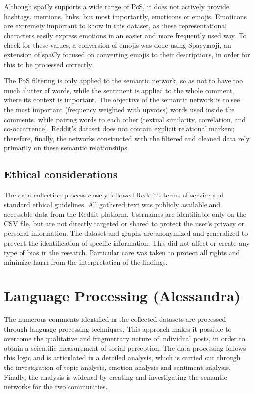 \documentclass[conference]{IEEEtran}
\begin{document}
Although spaCy supports a wide range of PoS, it does not actively provide hashtags, mentions, links, but most importantly, emoticons or emojis. Emoticons are extremely important to know in this dataset, as these representational characters easily express emotions in an easier and more frequently used way. To check for these values, a conversion of emojis was done using Spacymoji, an extension of spaCy focused on converting emojis to their descriptions, in order for this to be processed correctly.

The PoS filtering is only applied to the semantic network, so as not to have too much clutter of words, while the sentiment is applied to the whole comment, where its context is important. The objective of the semantic network is to see the most important (frequency weighted with upvotes) words used inside the comments, while pairing words to each other (textual similarity, correlation, and co-occurrence). Reddit’s dataset does not contain explicit relational markers; therefore, finally, the networks constructed with the filtered and cleaned data rely primarily on these semantic relationships.

\subsection{Ethical considerations}
The data collection process closely followed Reddit’s terms of service and standard ethical guidelines. All gathered text was publicly available and accessible data from the Reddit platform. Usernames are identifiable only on the CSV file, but are not directly targeted or shared to protect the user’s privacy or personal information. The dataset and graphs are anonymized and generalized to prevent the identification of specific information. This did not affect or create any type of bias in the research. Particular care was taken to protect all rights and minimize harm from the interpretation of the findings.

\section{Language Processing (Alessandra)}
The numerous comments identified in the collected datasets are processed through language processing techniques. This approach makes it possible to overcome the qualitative and fragmentary nature of individual posts, in order to obtain a scientific measurement of social perception. The data processing follows this logic and is articulated in a detailed analysis, which is carried out through the investigation of topic analysis, emotion analysis and sentiment analysis. Finally, the analysis is widened by creating and investigating the semantic networks for the two communities.
\end{document}
